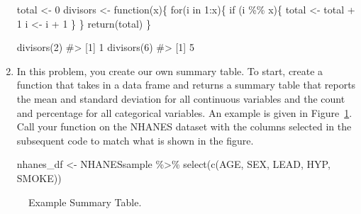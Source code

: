 \documentclass[
  letterpaper,
]{latex/krantz}
\makeatletter
\newenvironment{Shaded}{\begin{snugshade}}{\end{snugshade}}
\newcommand{\CommentTok}[1]{\textcolor[rgb]{0.37,0.37,0.37}{#1}}
\newcommand{\ControlFlowTok}[1]{\textcolor[rgb]{0.00,0.23,0.31}{#1}}
\newcommand{\DecValTok}[1]{\textcolor[rgb]{0.68,0.00,0.00}{#1}}
\newcommand{\FunctionTok}[1]{\textcolor[rgb]{0.28,0.35,0.67}{#1}}
\newcommand{\NormalTok}[1]{\textcolor[rgb]{0.00,0.23,0.31}{#1}}
\newcommand{\OtherTok}[1]{\textcolor[rgb]{0.00,0.23,0.31}{#1}}
\newcommand{\SpecialCharTok}[1]{\textcolor[rgb]{0.37,0.37,0.37}{#1}}
\newenvironment{kframe}{%
\medskip{}
\setlength{\fboxsep}{.8em}
 \def\at@end@of@kframe{}%
 \ifinner\ifhmode%
  \def\at@end@of@kframe{\end{minipage}}%
  \begin{minipage}{\columnwidth}%
 \fi\fi%
 \def\FrameCommand##1{\hskip\@totalleftmargin \hskip-\fboxsep
 \colorbox{shadecolor}{##1}\hskip-\fboxsep
     \hskip-\linewidth \hskip-\@totalleftmargin \hskip\columnwidth}%
 \MakeFramed {\advance\hsize-\width
   \@totalleftmargin\z@ \linewidth\hsize
   \@setminipage}}%
 {\par\unskip\endMakeFramed%
 \at@end@of@kframe}
\renewenvironment{Shaded}{\begin{kframe}}{\end{kframe}}
\makeatother
\begin{document}
\begin{enumerate}
\begin{Shaded}
\begin{Highlighting}[]
\NormalTok{total }\OtherTok{\textless{}{-}} \DecValTok{0}
\NormalTok{divisors }\OtherTok{\textless{}{-}} \ControlFlowTok{function}\NormalTok{(x)\{}
  \ControlFlowTok{for}\NormalTok{(i }\ControlFlowTok{in} \DecValTok{1}\SpecialCharTok{:}\NormalTok{x)\{}
    \ControlFlowTok{if}\NormalTok{ (i }\SpecialCharTok{\%\%}\NormalTok{ x)\{}
\NormalTok{      total }\OtherTok{\textless{}{-}}\NormalTok{ total }\SpecialCharTok{+} \DecValTok{1}
\NormalTok{      i }\OtherTok{\textless{}{-}}\NormalTok{ i }\SpecialCharTok{+} \DecValTok{1}
\NormalTok{    \}}
\NormalTok{  \}}
  \FunctionTok{return}\NormalTok{(total)}
\NormalTok{  \}}

\FunctionTok{divisors}\NormalTok{(}\DecValTok{2}\NormalTok{)}
\CommentTok{\#\textgreater{} [1] 1}
\FunctionTok{divisors}\NormalTok{(}\DecValTok{6}\NormalTok{)}
\CommentTok{\#\textgreater{} [1] 5}
\end{Highlighting}
\end{Shaded}
\item
  In this problem, you create our own summary table. To start, create a
  function that takes in a data frame and returns a summary table that
  reports the mean and standard deviation for all continuous variables
  and the count and percentage for all categorical variables. An example
  is given in Figure~\ref{fig-summary-table}. Call your function on the
  NHANES dataset with the columns selected in the subsequent code to
  match what is shown in the figure.~

\begin{Shaded}
\begin{Highlighting}[]
\NormalTok{nhanes\_df }\OtherTok{\textless{}{-}}\NormalTok{ NHANESsample }\SpecialCharTok{\%\textgreater{}\%}
  \FunctionTok{select}\NormalTok{(}\FunctionTok{c}\NormalTok{(AGE, SEX, LEAD, HYP, SMOKE))}
\end{Highlighting}
\end{Shaded}
\end{enumerate}

\begin{figure}


\caption{\label{fig-summary-table}Example Summary Table.}

\end{figure}%
\end{document}
